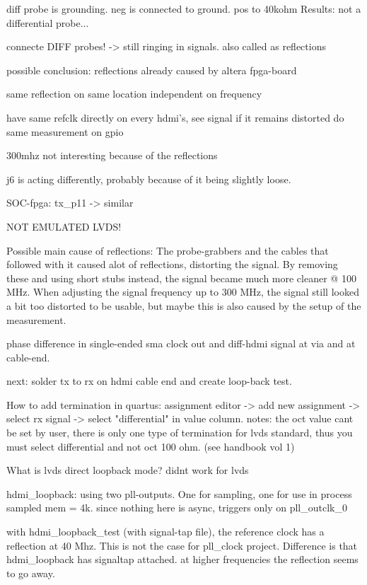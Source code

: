 \documentclass[main.tex]{subfiles}
\begin{document}
diff probe is grounding. neg is connected to ground. pos to 40kohm
 Results: not a differential probe...

 connecte DIFF probes! -> still ringing in signals. also called as reflections

 possible conclusion: reflections already caused by altera fpga-board

 same reflection on same location independent on frequency 

have same refclk directly on every hdmi's, see signal if it remains distorted
do same measurement on gpio

300mhz not interesting because of the reflections

j6 is acting differently, probably because of it being slightly loose.

SOC-fpga: tx\_p11 -> similar 

NOT EMULATED LVDS! 

Possible main cause of reflections: The probe-grabbers and the cables that followed with it caused alot of reflections, distorting the signal. By removing these and using short stubs instead, the signal became much more cleaner @ 100 MHz. When adjusting the signal frequency up to 300 MHz, the signal still looked a bit too distorted to be usable, but maybe this is also caused by the setup of the measurement.

phase difference in single-ended sma clock out and diff-hdmi signal at via and at cable-end.

next: solder tx to rx on hdmi cable end and create loop-back test.

How to add termination in quartus: assignment editor -> add new assignment -> select rx signal -> select "differential" in value column. 
notes: the oct value cant be set by user, there is only one type of termination for lvds standard, thus you must select differential and not oct 100 ohm. (see handbook vol 1) 

What is lvds direct loopback mode?
didnt work for lvds

hdmi\_loopback: using two pll-outputs. One for sampling, one for use in process
sampled mem = 4k.
since nothing here is async, triggers only on pll\_outclk\_0

with hdmi\_loopback\_test (with signal-tap file), the reference clock has a reflection at 40 Mhz. This is not the case for pll\_clock project. Difference is that hdmi\_loopback has signaltap attached. at higher frequencies the reflection seems to go away.
\end{document}
